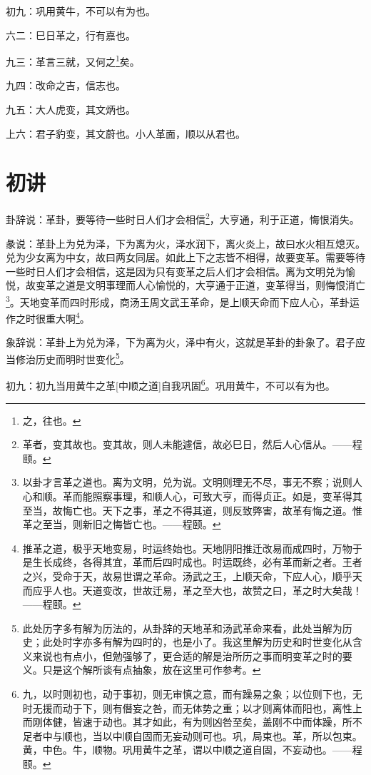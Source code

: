 \documentclass[12pt,oneside]{book}
\begin{document}
初九：巩用黄牛，不可以有为也。

六二：巳日革之，行有嘉也。

九三：革言三就，又何之\footnote{之，往也。}矣。

九四：改命之吉，信志也。

九五：大人虎变，其文炳也。

上六：君子豹变，其文蔚也。小人革面，顺以从君也。

\section{初讲}
卦辞说：革卦，要等待一些时日人们才会相信\footnote{革者，变其故也。变其故，则人未能遽信，故必巳日，然后人心信从。——程颐。}，大亨通，利于正道，悔恨消失。

彖说：革卦上为兑为泽，下为离为火，泽水润下，离火炎上，故曰水火相互熄灭。兑为少女离为中女，故曰两女同居。如此上下之志皆不相得，故要变革。需要等待一些时日人们才会相信，这是因为只有变革之后人们才会相信。离为文明兑为愉悦，故变革之道是文明事理而人心愉悦的，大亨通于正道，变革得当，则悔恨消亡\footnote{以卦才言革之道也。离为文明，兑为说。文明则理无不尽，事无不察；说则人心和顺。革而能照察事理，和顺人心，可致大亨，而得贞正。如是，变革得其至当，故悔亡也。天下之事，革之不得其道，则反致弊害，故革有悔之道。惟革之至当，则新旧之悔皆亡也。——程颐。}。天地变革而四时形成，商汤王周文武王革命，是上顺天命而下应人心，革卦运作之时很重大啊\footnote{推革之道，极乎天地变易，时运终始也。天地阴阳推迁改易而成四时，万物于是生长成终，各得其宜，革而后四时成也。时运既终，必有革而新之者。王者之兴，受命于天，故易世谓之革命。汤武之王，上顺天命，下应人心，顺乎天而应乎人也。天道变改，世故迁易，革之至大也，故赞之曰，革之时大矣哉！——程颐。}。

象辞说：革卦上为兑为泽，下为离为火，泽中有火，这就是革卦的卦象了。君子应当修治历史而明时世变化\footnote{此处历字多有解为历法的，从卦辞的天地革和汤武革命来看，此处当解为历史；此处时字亦多有解为四时的，也是小了。我这里解为历史和时世变化从含义来说也有点小，但勉强够了，更合适的解是治所历之事而明变革之时的要义。只是这个解所谈有点抽象，放在这里可作参考。}。

初九：初九当用黄牛之革[中顺之道]自我巩固\footnote{九，以时则初也，动于事初，则无审慎之意，而有躁易之象；以位则下也，无时无援而动于下，则有僭妄之咎，而无体势之重；以才则离体而阳也，离性上而刚体健，皆速于动也。其才如此，有为则凶咎至矣，盖刚不中而体躁，所不足者中与顺也，当以中顺自固而无妄动则可也。巩，局束也。革，所以包束。黄，中色。牛，顺物。巩用黄牛之革，谓以中顺之道自固，不妄动也。——程颐。}。巩用黄牛，不可以有为也。
\end{document}
